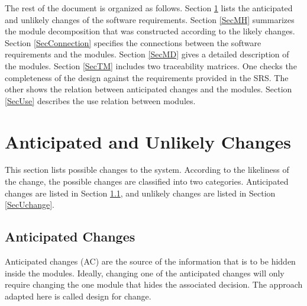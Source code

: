 \documentclass[12pt, titlepage]{article}
\begin{document}
	The rest of the document is organized as follows. Section
	\ref{SecChange} lists the anticipated and unlikely changes of the software
	requirements. Section \ref{SecMH} summarizes the module decomposition that
	was constructed according to the likely changes. Section \ref{SecConnection}
	specifies the connections between the software requirements and the
	modules. Section \ref{SecMD} gives a detailed description of the
	modules. Section \ref{SecTM} includes two traceability matrices. One checks
	the completeness of the design against the requirements provided in the 
	SRS. The
	other shows the relation between anticipated changes and the modules. 
	Section
	\ref{SecUse} describes the use relation between modules.
	
	\section{Anticipated and Unlikely Changes} \label{SecChange}
	
	This section lists possible changes to the system. According to the 
	likeliness
	of the change, the possible changes are classified into two
	categories. Anticipated changes are listed in Section \ref{SecAchange}, and
	unlikely changes are listed in Section \ref{SecUchange}.
	
	\subsection{Anticipated Changes} \label{SecAchange}
	
	Anticipated changes (AC) are the source of the information that is to be 
	hidden
	inside the modules. Ideally, changing one of the anticipated changes will 
	only
	require changing the one module that hides the associated decision. The 
	approach
	adapted here is called design for
	change.
	
\end{document}

